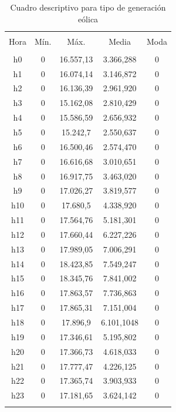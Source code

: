 \documentclass[conference, 10pt]{IEEEtran}
\begin{document}
\begin{table}[!htbp] \centering 
  \caption{Cuadro descriptivo para tipo de generación eólica} 
  \label{} 
\begin{tabular}{@{\extracolsep{5pt}} ccccc} 
\\[-1.8ex]\hline 
\hline \\[-1.8ex] 
Hora & Mín. & Máx. & Media & Moda \\ 
\hline \\[-1.8ex] 
h0 & 0 & 16.557,13 & 3.366,288& 0 \\ 
h1 & 0 & 16.074,14 & 3.146,872& 0 \\ 
h2 & 0 & 16.136,39 & 2.961,920& 0 \\ 
h3 & 0 & 15.162,08 & 2.810,429& 0 \\ 
h4 & 0 & 15.586,59 & 2.656,932& 0 \\ 
h5 & 0 & 15.242,7 & 2.550,637& 0 \\ 
h6 & 0 & 16.500,46 & 2.574,470& 0 \\ 
h7 & 0 & 16.616,68 & 3.010,651& 0 \\ 
h8 & 0 & 16.917,75 & 3.463,020& 0 \\ 
h9 & 0 & 17.026,27 & 3.819,577& 0 \\ 
h10 & 0 & 17.680,5 & 4.338,920& 0 \\ 
h11 & 0 & 17.564,76 & 5.181,301& 0 \\ 
h12 & 0 & 17.660,44 & 6.227,226& 0 \\ 
h13 & 0 & 17.989,05 & 7.006,291& 0 \\ 
h14 & 0 & 18.423,85 & 7.549,247& 0 \\ 
h15 & 0 & 18.345,76 & 7.841,002& 0 \\ 
h16 & 0 & 17.863,57 & 7.736,863& 0 \\ 
h17 & 0 & 17.865,31 & 7.151,004& 0 \\ 
h18 & 0 & 17.896,9 & 6.101,1048& 0 \\ 
h19 & 0 & 17.346,61 & 5.195,802& 0 \\ 
h20 & 0 & 17.366,73 & 4.618,033& 0 \\ 
h21 & 0 & 17.777,47 & 4.226,125& 0 \\ 
h22 & 0 & 17.365,74 & 3.903,933& 0 \\ 
h23 & 0 & 17.181,65 & 3.624,142& 0 \\ 
\hline \\[-1.8ex] 
\end{tabular} 
\label{tab_19}
\end{table}
\end{document}
